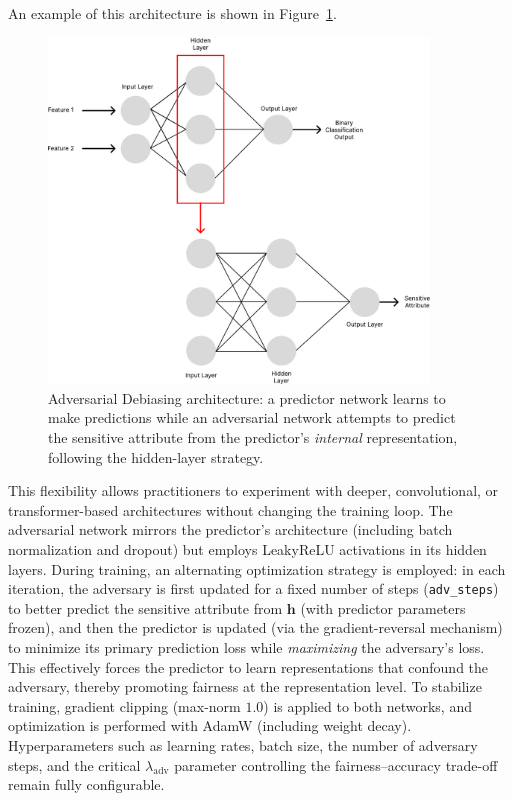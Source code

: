 \documentclass[12pt,a4paper,openright,twoside]{book}
\begin{document}
An example of this architecture is shown in Figure~\ref{fig:adversarial_debiasing}.
\begin{figure}
  \centering
  \includegraphics[width=0.9\textwidth]{figures/adversarial_debiasing.pdf}
  \caption{Adversarial Debiasing architecture: a predictor network learns to make predictions while an adversarial network attempts to predict the sensitive attribute from the predictor's \emph{internal} representation, following the hidden-layer strategy.}
  \label{fig:adversarial_debiasing}
\end{figure}

This flexibility allows practitioners to experiment with deeper, convolutional, or transformer-based architectures without changing the training loop.  The adversarial network mirrors the predictor's architecture (including batch normalization and dropout) but employs LeakyReLU activations in its hidden layers.  During training, an alternating optimization strategy is employed: in each iteration, the adversary is first updated for a fixed number of steps (\texttt{adv\_steps}) to better predict the sensitive attribute from $\mathbf{h}$ (with predictor parameters frozen), and then the predictor is updated (via the gradient-reversal mechanism) to minimize its primary prediction loss while \emph{maximizing} the adversary’s loss.  This effectively forces the predictor to learn representations that confound the adversary, thereby promoting fairness at the representation level.  To stabilize training, gradient clipping (max-norm $1.0$) is applied to both networks, and optimization is performed with AdamW (including weight decay).  Hyperparameters such as learning rates, batch size, the number of adversary steps, and the critical $\lambda_{\text{adv}}$ parameter controlling the fairness–accuracy trade-off remain fully configurable.
\end{document}
